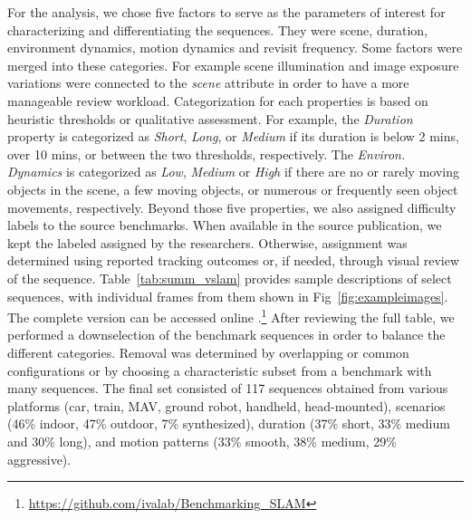 For the analysis, we chose 
five
factors to serve as the
parameters of interest for characterizing and differentiating the
sequences.  They were scene, duration, environment dynamics, motion
dynamics and revisit frequency.  Some factors were merged into these
categories.  For example scene illumination and image exposure variations
were connected to the \textit{scene} attribute in order to have a more
manageable review workload.
Categorization for each properties is based on heuristic thresholds or
qualitative assessment. 
For example, the \textit{Duration} property is categorized as 
\textit{Short}, \textit{Long}, or \textit{Medium} if its duration
is below 2 mins, over 10 mins, or between the two thresholds, respectively. 
The \textit{Environ. Dynamics} is categorized as \textit{Low}, \textit{Medium} 
or \textit{High} if there are no or rarely moving objects in the scene, 
a few moving objects, or numerous or frequently seen object movements, 
respectively. 
Beyond those five properties, we also assigned difficulty labels to the
source benchmarks. When available in the source publication, we kept the
labeled assigned by the researchers. Otherwise, assignment was determined
using reported tracking outcomes or, if needed, through visual review of
the sequence. 
Table~\ref{tab:summ_vslam} provides sample descriptions of select
sequences, with individual frames from them shown in Fig~\ref{fig:exampleimages}. 
The complete version can be 
accessed online
.\!\!\footnote{\url{https://github.com/ivalab/Benchmarking_SLAM}} 
After reviewing the full table, we performed a downselection of the
benchmark sequences in order to balance the different categories.
Removal was determined by overlapping or common configurations or by
choosing a characteristic subset from a benchmark with many sequences.
The final set consisted of 
117
 sequences obtained from
various platforms (car, train, MAV, ground robot, handheld, head-mounted), 
scenarios (46\% indoor, 47\% outdoor, 7\% synthesized), 
duration (37\% short, 33\% medium and 30\% long), 
and motion patterns (33\% smooth, 38\% medium, 29\% aggressive). 


